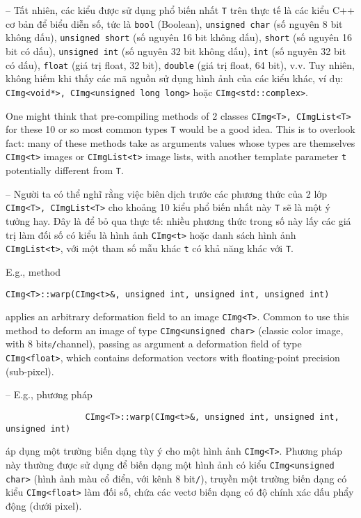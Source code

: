 \documentclass{article}
\begin{document}
\begin{itemize}
\begin{itemize}
\begin{enumerate}
            -- Tất nhiên, các kiểu được sử dụng phổ biến nhất {\tt T} trên thực tế là các kiểu C++ cơ bản để biểu diễn số, tức là {\tt bool} (Boolean), {\tt unsigned char} (số nguyên 8 bit không dấu), {\tt unsigned short} (số nguyên 16 bit không dấu), {\tt short} (số nguyên 16 bit có dấu), {\tt unsigned int} (số nguyên 32 bit không dấu), {\tt int} (số nguyên 32 bit có dấu), {\tt float} (giá trị float, 32 bit), {\tt double} (giá trị float, 64 bit), v.v. Tuy nhiên, không hiếm khi thấy các mã nguồn sử dụng hình ảnh của các kiểu khác, ví dụ: {\tt CImg<void*>, CImg<unsigned long long>} hoặc {\tt CImg<std::complex>}.
            
            One might think that pre-compiling methods of 2 classes {\tt CImg<T>, CImgList<T>} for these 10 or so most common types {\tt T} would be a good idea. This is to overlook fact: many of these methods take as arguments values whose types are themselves {\tt CImg<t>} images or {\tt CImgList<t>} image lists, with another template parameter {\tt t} potentially different from {\tt T}.
            
            -- Người ta có thể nghĩ rằng việc biên dịch trước các phương thức của 2 lớp {\tt CImg<T>, CImgList<T>} cho khoảng 10 kiểu phổ biến nhất này {\tt T} sẽ là một ý tưởng hay. Đây là để bỏ qua thực tế: nhiều phương thức trong số này lấy các giá trị làm đối số có kiểu là hình ảnh {\tt CImg<t>} hoặc danh sách hình ảnh {\tt CImgList<t>}, với một tham số mẫu khác {\tt t} có khả năng khác với {\tt T}.
            
            E.g., method
            \begin{verbatim}
CImg<T>::warp(CImg<t>&, unsigned int, unsigned int, unsigned int)
            \end{verbatim}
            applies an arbitrary deformation field to an image {\tt CImg<T>}. Common to use this method to deform an image of type {\tt CImg<unsigned char>} (classic color image, with 8 bits{\tt/}channel), passing as argument a deformation field of type {\tt CImg<float>}, which contains deformation vectors with floating-point precision (sub-pixel).
            
            -- E.g., phương pháp
            \begin{verbatim}
                CImg<T>::warp(CImg<t>&, unsigned int, unsigned int, unsigned int)
            \end{verbatim}
            áp dụng một trường biến dạng tùy ý cho một hình ảnh {\tt CImg<T>}. Phương pháp này thường được sử dụng để biến dạng một hình ảnh có kiểu {\tt CImg<unsigned char>} (hình ảnh màu cổ điển, với kênh 8 bit{\tt/}), truyền một trường biến dạng có kiểu {\tt CImg<float>} làm đối số, chứa các vectơ biến dạng có độ chính xác dấu phẩy động (dưới pixel).
            

\end{enumerate}
\end{itemize}
\end{itemize}
\end{document}
